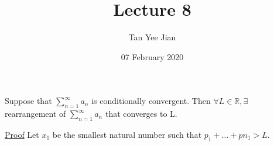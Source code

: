 \documentclass[12pt, a4paper]{article}
\title{Lecture 8}
\author{Tan Yee Jian}
\date{07 February 2020}
\begin{document}
    \maketitle
     Suppose that $\sum\limits_{n=1}^{\infty}{a_n} $ is conditionally convergent. Then $\forall L \in \mathbb{R}, \exists$
    rearrangement of $\sum\limits_{n=1}^{\infty}{a_n}$  that converges to L.

    \underline{Proof} Let $x_1$ be the smallest natural number such that $p_1 + \dots + pn_1 > L$.
\end{document}

